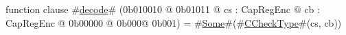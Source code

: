 function clause #\hyperref[zdecode]{decode}# (0b010010 @ 0b01011 @ cs : CapRegEnc @ cb : CapRegEnc @ 0b00000 @ 0b000@ 0b001) = #\hyperref[zSome]{Some}#(#\hyperref[zCCheckType]{CCheckType}#(cs, cb))
